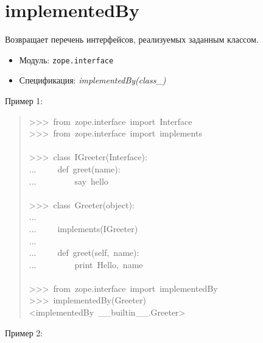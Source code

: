 \documentclass[14pt,a4paper,openany,twoside,final]{extbook}
\providecommand*{\DUroletitlereference}[1]{\textsl{#1}}
\begin{document}
\section*{implementedBy%
  \label{implementedby}%
}

Возвращает перечень интерфейсов, реализуемых заданным классом.

\begin{itemize}

\item Модуль: \texttt{zope.interface}

\item Спецификация: \DUroletitlereference{implementedBy(class\_)}

\end{itemize}

Пример 1:

\begin{quote}{\ttfamily \raggedright \noindent
>{}>{}>~from~zope.interface~import~Interface\\
>{}>{}>~from~zope.interface~import~implements\\
~\\
>{}>{}>~class~IGreeter(Interface):\\
...~~~~~def~greet(name):\\
...~~~~~~~~~\textquotedbl{}say~hello\textquotedbl{}\\
~\\
>{}>{}>~class~Greeter(object):\\
...\\
...~~~~~implements(IGreeter)\\
...\\
...~~~~~def~greet(self,~name):\\
...~~~~~~~~~print~\textquotedbl{}Hello\textquotedbl{},~name\\
~\\
>{}>{}>~from~zope.interface~import~implementedBy\\
>{}>{}>~implementedBy(Greeter)\\
<implementedBy~\_\_builtin\_\_.Greeter>
}
\end{quote}

Пример 2:
\end{document}
